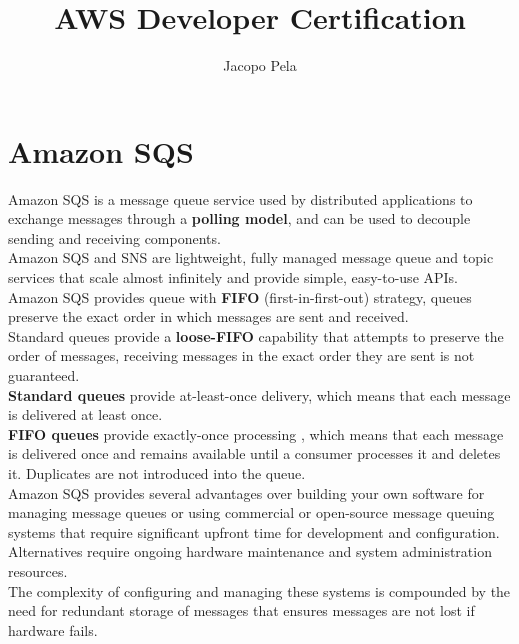 \documentclass[12pt, letterpaper, twoside]{article}
\title{AWS Developer Certification}
\author{Jacopo Pela}
\begin{document}
\begin{titlepage}
\maketitle
\end{titlepage}

\tableofcontents
\newpage

\section{Amazon SQS}
Amazon SQS is a message queue service used by distributed applications to exchange messages through a \textbf{polling model}, 
and can be used to decouple sending and receiving components.\\

Amazon SQS and SNS are lightweight, fully managed message queue and topic services that scale almost infinitely and 
provide simple, easy-to-use APIs.\\

Amazon SQS provides queue with \textbf{FIFO} (first-in-first-out) strategy, queues preserve the exact order in which messages 
are sent and received.\\
Standard queues provide a \textbf{loose-FIFO} capability that attempts to preserve the order of messages, receiving messages in 
the exact order they are sent is not guaranteed.\\

\textbf{Standard queues} provide at-least-once delivery, which means that each message is delivered at least once.\\
\textbf{FIFO queues} provide exactly-once processing , which means that each message is delivered once and remains available 
until a consumer processes it and deletes it. Duplicates are not introduced into the queue.\\

Amazon SQS provides several advantages over building your own software for managing message queues or using commercial 
or open-source message queuing systems that require significant upfront time for development and configuration.\\

Alternatives require ongoing hardware maintenance and system administration resources.\\
The complexity of configuring and managing these systems is compounded by the need for redundant storage of messages 
that ensures messages are not lost if hardware fails.\\
\end{document}
